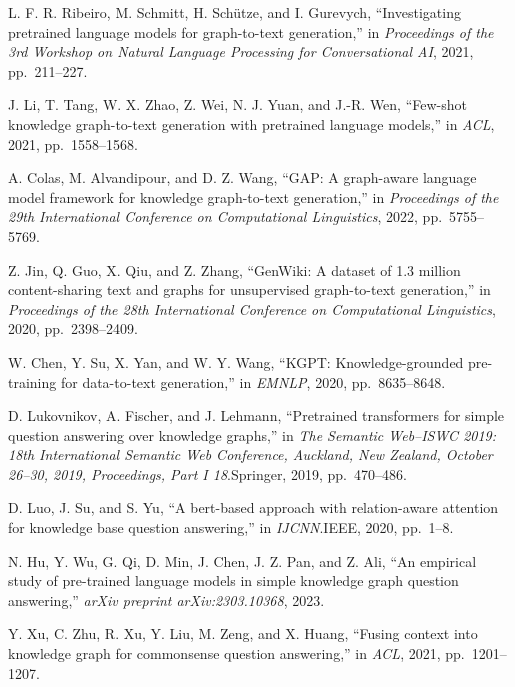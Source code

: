 \begin{enumerate}[leftmargin=2em,label={[\arabic*]}]
\item L. F. R. Ribeiro, M. Schmitt, H. Sch\"{u}tze, and I. Gurevych, ``Investigating pretrained language models for graph-to-text generation,'' in \textit{Proceedings of the 3rd Workshop on Natural Language Processing for Conversational AI}, 2021, pp.~211--227.

\item J. Li, T. Tang, W. X. Zhao, Z. Wei, N. J. Yuan, and J.-R. Wen, ``Few-shot knowledge graph-to-text generation with pretrained language models,'' in \textit{ACL}, 2021, pp.~1558--1568.

\item A. Colas, M. Alvandipour, and D. Z. Wang, ``GAP: A graph-aware language model framework for knowledge graph-to-text generation,'' in \textit{Proceedings of the 29th International Conference on Computational Linguistics}, 2022, pp.~5755--5769.

\item Z. Jin, Q. Guo, X. Qiu, and Z. Zhang, ``GenWiki: A dataset of 1.3 million content-sharing text and graphs for unsupervised graph-to-text generation,'' in \textit{Proceedings of the 28th International Conference on Computational Linguistics}, 2020, pp.~2398--2409.

\item W. Chen, Y. Su, X. Yan, and W. Y. Wang, ``KGPT: Knowledge-grounded pre-training for data-to-text generation,'' in \textit{EMNLP}, 2020, pp.~8635--8648.

\item D. Lukovnikov, A. Fischer, and J. Lehmann, ``Pretrained transformers for simple question answering over knowledge graphs,'' in \textit{The Semantic Web--ISWC 2019: 18th International Semantic Web Conference, Auckland, New Zealand, October 26--30, 2019, Proceedings, Part I 18}.\quad Springer, 2019, pp.~470--486.

\item D. Luo, J. Su, and S. Yu, ``A bert-based approach with relation-aware attention for knowledge base question answering,'' in \textit{IJCNN}.\quad IEEE, 2020, pp.~1--8.

\item N. Hu, Y. Wu, G. Qi, D. Min, J. Chen, J. Z. Pan, and Z. Ali, ``An empirical study of pre-trained language models in simple knowledge graph question answering,'' \textit{arXiv preprint arXiv:2303.10368}, 2023.

\item Y. Xu, C. Zhu, R. Xu, Y. Liu, M. Zeng, and X. Huang, ``Fusing context into knowledge graph for commonsense question answering,'' in \textit{ACL}, 2021, pp.~1201--1207.


\end{enumerate}
